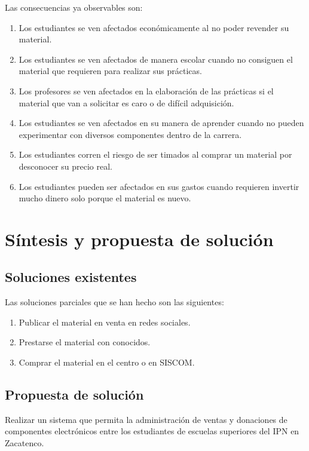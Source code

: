 Las consecuencias ya observables son:

\begin{enumerate}
	\item Los estudiantes se ven afectados económicamente al no poder revender su material.
	\item Los estudiantes se ven afectados de manera escolar cuando no consiguen el material que requieren para realizar sus prácticas.
	\item Los profesores se ven afectados en la elaboración de las prácticas si el material que van a solicitar es caro o de difícil adquisición.
	\item Los estudiantes se ven afectados en su manera de aprender cuando no pueden experimentar con diversos componentes dentro de la carrera.
	\item Los estudiantes corren el riesgo de ser timados al comprar un material por desconocer su precio real.
	\item Los estudiantes pueden ser afectados en sus gastos cuando requieren invertir mucho dinero solo porque el material es nuevo.		
\end{enumerate}

\section{Síntesis y propuesta de solución}

\subsection{Soluciones existentes}

Las soluciones parciales que se han hecho son las siguientes:

\begin{enumerate}
	\item Publicar el material en venta en redes sociales.
	\item Prestarse el material con conocidos.
	\item Comprar el material en el centro o en SISCOM.
\end{enumerate}

\subsection{Propuesta de solución}

Realizar un sistema que permita la administración de ventas y donaciones de componentes electrónicos entre los estudiantes de escuelas superiores del IPN en Zacatenco.

